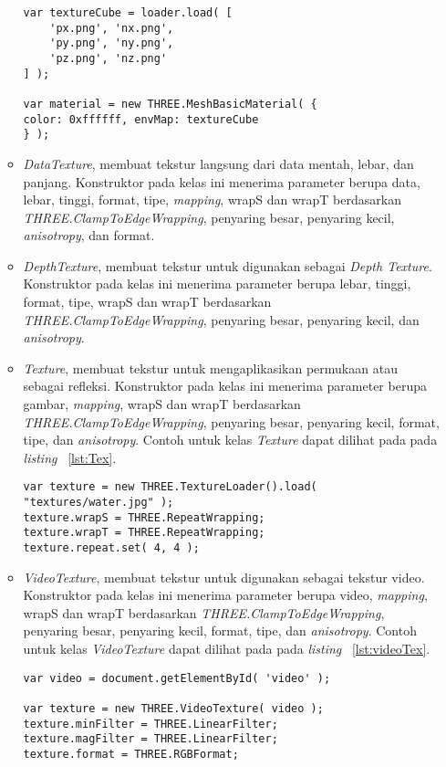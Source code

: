 \begin{itemize}
\begin{itemize}
\begin{lstlisting}[caption={Contoh penggunaan kelas {\it CubeTexture}.}, label={lst:cubeTex},captionpos=b]
var textureCube = loader.load( [
	'px.png', 'nx.png',
	'py.png', 'ny.png',
	'pz.png', 'nz.png'
] );

var material = new THREE.MeshBasicMaterial( { 
color: 0xffffff, envMap: textureCube 
} );
\end{lstlisting}
		\item{\it DataTexture}, membuat tekstur langsung dari data mentah, lebar, dan panjang. Konstruktor pada kelas ini menerima parameter berupa data, lebar, tinggi, format, tipe, {\it mapping}, wrapS dan wrapT berdasarkan {\it THREE.ClampToEdgeWrapping}, penyaring besar, penyaring kecil, {\it anisotropy}, dan format.
		\item{\it DepthTexture}, membuat tekstur untuk digunakan sebagai {\it Depth Texture}. Konstruktor pada kelas ini menerima parameter berupa lebar, tinggi, format, tipe, wrapS dan wrapT berdasarkan {\it THREE.ClampToEdgeWrapping}, penyaring besar, penyaring kecil, dan {\it anisotropy}.
		\item{\it Texture}, membuat tekstur untuk mengaplikasikan permukaan atau sebagai refleksi. Konstruktor pada kelas ini menerima parameter berupa gambar, {\it mapping},  wrapS dan wrapT berdasarkan {\it THREE.ClampToEdgeWrapping}, penyaring besar, penyaring kecil, format, tipe, dan {\it anisotropy}. Contoh untuk kelas {\it Texture} dapat dilihat pada pada {\it listing} ~\ref{lst:Tex}.
\begin{lstlisting}[caption={Contoh penggunaan kelas {\it Texture}.}, label={lst:Tex},captionpos=b]
var texture = new THREE.TextureLoader().load( "textures/water.jpg" );
texture.wrapS = THREE.RepeatWrapping;
texture.wrapT = THREE.RepeatWrapping;
texture.repeat.set( 4, 4 );
\end{lstlisting}
		\item{\it VideoTexture}, membuat tekstur untuk digunakan sebagai tekstur video. Konstruktor pada kelas ini menerima parameter berupa video, {\it mapping},  wrapS dan wrapT berdasarkan {\it THREE.ClampToEdgeWrapping}, penyaring besar, penyaring kecil, format, tipe, dan {\it anisotropy}. Contoh untuk kelas {\it VideoTexture} dapat dilihat pada pada {\it listing} ~\ref{lst:videoTex}.
\begin{lstlisting}[caption={Contoh penggunaan kelas {\it VideoTexture}.}, label={lst:videoTex},captionpos=b]
var video = document.getElementById( 'video' );

var texture = new THREE.VideoTexture( video );
texture.minFilter = THREE.LinearFilter;
texture.magFilter = THREE.LinearFilter;
texture.format = THREE.RGBFormat;
\end{lstlisting}
	\end{itemize}

\end{itemize}


